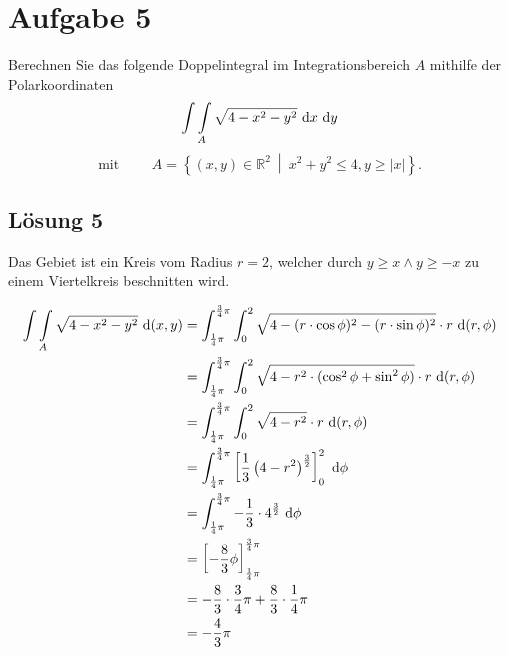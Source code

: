 \documentclass[main.tex]{subfiles}
\begin{document}
\section{Aufgabe 5}
Berechnen Sie das folgende Doppelintegral im Integrationsbereich $A$ mithilfe der Polarkoordinaten
\[
    \int \int \limits_{A} \sqrt{4 - x^2 - y^2} ~\mathrm{d}x ~\mathrm{d}y
\]
\[
\mbox{mit } \qquad
    A = \left\{ (x,y) \in \mathbb{R}^2 \ \middle| \ x^2 + y^2 \leq 4, y \geq |x| \right\}.
\]

\subsection{Lösung 5}
Das Gebiet ist ein Kreis vom Radius $r=2$, welcher durch $y\geq x \land y \geq -x$ zu einem Viertelkreis beschnitten wird.

\begin{align*}
    \int \int \limits_{A} \sqrt{4 - x^2 - y^2} ~\mathrm{d}(x,y)
    &=
    \int_{\frac{1}{4}\pi}^{\frac{3}{4}\pi}
    \int_{0}^{2}
        \sqrt{4 - (r\cdot \cos \phi)^2 - (r\cdot \sin \phi)^2}
        \cdot r
    ~\mathrm{d}(r,\phi) \\
    &=
    \int_{\frac{1}{4}\pi}^{\frac{3}{4}\pi}
    \int_{0}^{2}
        \sqrt{4 - r^2\cdot (\cos^2 \phi + \sin^2 \phi)}
        \cdot r
    ~\mathrm{d}(r,\phi) \\
    &=
    \int_{\frac{1}{4}\pi}^{\frac{3}{4}\pi}
    \int_{0}^{2}
        \sqrt{4 - r^2}
        \cdot r
    ~\mathrm{d}(r,\phi) \\
    &=
    \int_{\frac{1}{4}\pi}^{\frac{3}{4}\pi}
    \left[
        \frac{1}{3} \left( 4 - r^2 \right)^{\frac{3}{2}}
    \right]_{0}^{2}
    ~\mathrm{d}\phi \\
    &=
    \int_{\frac{1}{4}\pi}^{\frac{3}{4}\pi}
        - \frac{1}{3} \cdot 4^{\frac{3}{2}}
    ~\mathrm{d}\phi \\
    &=
    \left[
        - \frac{8}{3}\phi
    \right]_{\frac{1}{4}\pi}^{\frac{3}{4}\pi} \\
    &=
        - \frac{8}{3} \cdot \frac{3}{4}\pi + \frac{8}{3}\cdot \frac{1}{4}\pi \\
    &= - \frac{4}{3} \pi
\end{align*}
\end{document}
